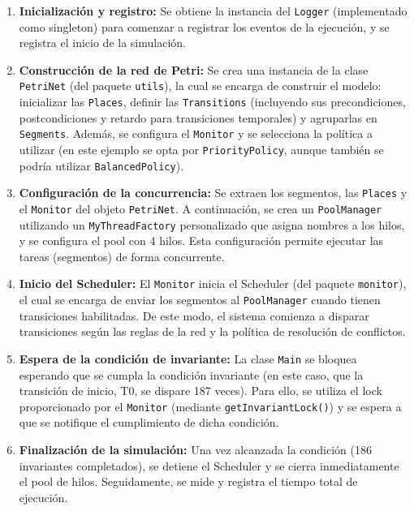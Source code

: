 \documentclass[12pt]{article}
\begin{document}
\begin{enumerate}
    \item \textbf{Inicialización y registro:}  
    Se obtiene la instancia del \texttt{Logger} (implementado como singleton) para comenzar a registrar los eventos de la ejecución, y se registra el inicio de la simulación.

    \item \textbf{Construcción de la red de Petri:}  
    Se crea una instancia de la clase \texttt{PetriNet} (del paquete \texttt{utils}), la cual se encarga de construir el modelo: inicializar las \texttt{Places}, definir las \texttt{Transitions} (incluyendo sus precondiciones, postcondiciones y retardo para transiciones temporales) y agruparlas en \texttt{Segments}. Además, se configura el \texttt{Monitor} y se selecciona la política a utilizar (en este ejemplo se opta por \texttt{PriorityPolicy}, aunque también se podría utilizar \texttt{BalancedPolicy}).

    \item \textbf{Configuración de la concurrencia:}  
    Se extraen los segmentos, las \texttt{Places} y el \texttt{Monitor} del objeto \texttt{PetriNet}. A continuación, se crea un \texttt{PoolManager} utilizando un \texttt{MyThreadFactory} personalizado que asigna nombres a los hilos, y se configura el pool con 4 hilos. Esta configuración permite ejecutar las tareas (segmentos) de forma concurrente.

    \item \textbf{Inicio del Scheduler:}  
    El \texttt{Monitor} inicia el Scheduler (del paquete \texttt{monitor}), el cual se encarga de enviar los segmentos al \texttt{PoolManager} cuando tienen transiciones habilitadas. De este modo, el sistema comienza a disparar transiciones según las reglas de la red y la política de resolución de conflictos.

    \item \textbf{Espera de la condición de invariante:}  
    La clase \texttt{Main} se bloquea esperando que se cumpla la condición invariante (en este caso, que la transición de inicio, T0, se dispare 187 veces). Para ello, se utiliza el lock proporcionado por el \texttt{Monitor} (mediante \texttt{getInvariantLock()}) y se espera a que se notifique el cumplimiento de dicha condición.

    \item \textbf{Finalización de la simulación:}  
    Una vez alcanzada la condición (186 invariantes completados), se detiene el Scheduler y se cierra inmediatamente el pool de hilos. Seguidamente, se mide y registra el tiempo total de ejecución.


\end{enumerate}
\end{document}
